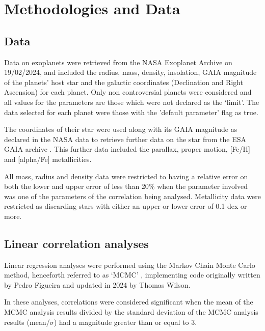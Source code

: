 \documentclass[a4paper,twocolumn,12pt]{article}
\begin{document}

\section{Methodologies and Data}
\subsection{Data}


Data on exoplanets were retrieved from the NASA Exoplanet Archive \cite{NASA Exoplanet Archive} on 19/02/2024, and included the radius, mass, density, insolation, GAIA magnitude of the planets' host star and the galactic coordinates (Declination and Right Ascension) for each planet. Only non controversial planets were considered and all values for the parameters are those which were not declared as the `limit'. The data selected for each planet were those with the 'default parameter' flag as true.

The coordinates of their star were used along with its GAIA magnitude as declared in the NASA data to retrieve further data on the star from the ESA GAIA archive \cite{GAIA Archive}. This further data included the parallax, proper motion, [Fe/H] and [alpha/Fe] metallicities.

All mass, radius and density data were restricted to having a relative error on both the lower and upper error of less than 20\% when the parameter involved was one of the parameters of the correlation being analysed. Metallicity data were restricted as discarding stars with either an upper or lower error of 0.1 dex or more.

\subsection{Linear correlation analyses}
\label{subsection: Linear Correlation Analysis}
Linear regression analyses were performed using the Markov Chain Monte Carlo method, henceforth referred to as `MCMC' \cite{MCMC}, implementing code originally written by Pedro Figueira and updated in 2024 by Thomas Wilson.


In these analyses, correlations were considered significant when the mean of the MCMC analysis results divided by the standard deviation of the MCMC analysis results (mean/$\sigma$) had a magnitude greater than or equal to 3.
\end{document}
